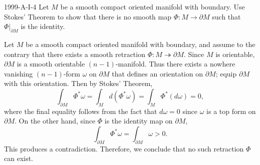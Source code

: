 \documentclass{article}
\begin{document}
	\begin{prb}{1999-A-I-4}
		Let $M$ be a smooth compact oriented manifold with boundary. Use Stokes' Theorem to show that there is no smooth map $\Phi: M \to \partial M$ such that $\Phi|_{\partial M}$ is the identity. 
	\end{prb}
	Let $M$ be a smooth compact oriented manifold with boundary, and assume to the contrary that there exists a smooth retraction $\Phi: M \twoheadrightarrow \partial M$. Since $M$ is orientable, $\partial M$ is a smooth orientable $(n-1)$-manifold. Thus there exists a nowhere vanishing $(n-1)$-form $\omega$ on $\partial M$ that defines an orientation on $\partial M$; equip $\partial M$ with this orientation. Then by Stokes' Theorem, 
	\begin{equation*}
		\int_{\partial M}\Phi^{\ast}\omega = \int_{M}d(\Phi^{\ast}\omega) = \int_{M}\Phi^{\ast}(d\omega) = 0, 
	\end{equation*}
	where the final equality follows from the fact that $d\omega = 0$ since $\omega$ is a top form on $\partial M$. On the other hand, since $\Phi$ is the identity map on $\partial M$, 
	\begin{equation*}
		\int_{\partial M}\Phi^{\ast}\omega = \int_{\partial M}\omega > 0. 
	\end{equation*}
	This produces a contradiction. Therefore, we conclude that no such retraction $\Phi$ can exist. 
	
\end{document}
